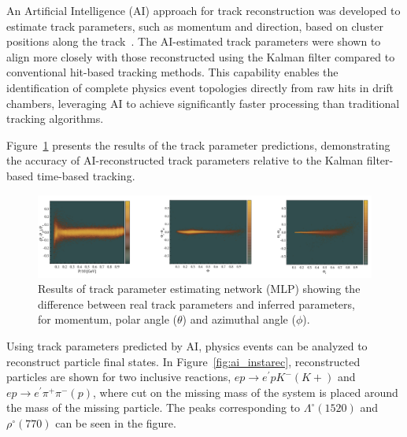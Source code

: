 \documentclass{webofc}
\begin{document}
An Artificial Intelligence (AI) approach for track reconstruction was developed to estimate track parameters, such as momentum and direction, based on cluster positions along the track~\cite{Thomadakis:2023ebe}. The AI-estimated track parameters were shown to align more closely with those reconstructed using the Kalman filter compared to conventional hit-based tracking methods. This capability enables the identification of complete physics event topologies directly from raw hits in drift chambers, leveraging AI to achieve significantly faster processing than traditional tracking algorithms.

Figure~\ref{fig:ai_inference} presents the results of the track parameter predictions, demonstrating the accuracy of AI-reconstructed track parameters relative to the Kalman filter-based time-based tracking.


\begin{figure}[h!]
\centering
\includegraphics[width=0.85\columnwidth]{images/mlp_track_pars.png}
\caption{Results of track parameter estimating network (MLP) showing the difference between real track parameters and inferred parameters, for momentum, polar angle ($\theta$) and azimuthal angle ($\phi$). } 
\label{fig:ai_inference}
\end{figure}

Using track parameters predicted by AI, physics events can be analyzed to reconstruct particle final states. In Figure~\ref{fig:ai_instarec}, reconstructed particles are shown for two inclusive reactions, $ep\rightarrow e^\prime p K^- (K+)$ and $ep\rightarrow e^\prime\pi^+\pi^-(p)$, where cut on the missing mass of the system is placed around the mass of the missing particle. The peaks corresponding to $\Lambda^\circ (1520)$ and $\rho^\circ (770)$ can be seen in the figure.
\end{document}

